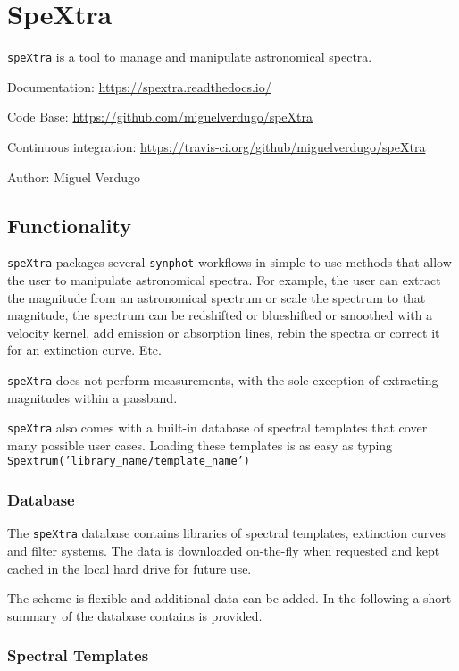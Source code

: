 

\section{SpeXtra%
  \label{spextra}%
}

\texttt{speXtra} is a tool to manage and manipulate astronomical spectra.

Documentation: \url{https://spextra.readthedocs.io/}

Code Base: \url{https://github.com/miguelverdugo/speXtra}

Continuous integration: \url{https://travis-ci.org/github/miguelverdugo/speXtra}

Author: Miguel Verdugo


\subsection{Functionality%
  \label{functionality}%
}

\texttt{speXtra} packages several \texttt{synphot} workflows in simple-to-use methods that allow the user
to manipulate astronomical spectra. For example, the user
can extract the magnitude from an astronomical spectrum or
scale the spectrum to that magnitude, the spectrum can be redshifted or
blueshifted or smoothed with a velocity kernel, add emission or absorption lines,
rebin the spectra or correct it for an extinction curve. Etc.

\texttt{speXtra} does not perform measurements, with the sole exception of extracting magnitudes within a passband.

\texttt{speXtra} also comes with a built-in database of spectral templates  that cover many possible user cases.
Loading these templates is as easy as typing \texttt{Spextrum('library\_name/template\_name')}


\subsubsection{Database%
  \label{database}%
}

The \texttt{speXtra} database contains libraries of spectral templates, extinction curves and filter systems.
The data is downloaded on-the-fly when requested and kept cached in the local hard drive for future use.

The scheme is flexible and additional data can be added.
In the following a short summary of the database contains is provided.


\subsubsection{Spectral Templates%
  \label{spectral-templates}%
}

